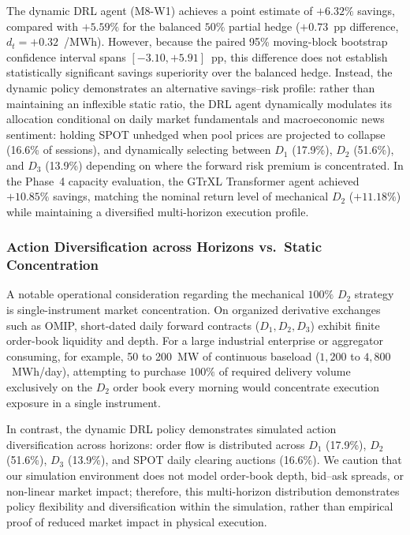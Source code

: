 The dynamic DRL agent (M8-W1) achieves a point estimate of $+6.32\%$ savings, compared with $+5.59\%$ for the balanced $50\%$ partial hedge ($+0.73$~pp difference, $d_t = +0.32$~\texteuro/MWh). However, because the paired 95\% moving-block bootstrap confidence interval spans $[-3.10, +5.91]$~pp, this difference does not establish statistically significant savings superiority over the balanced hedge. Instead, the dynamic policy demonstrates an alternative savings--risk profile: rather than maintaining an inflexible static ratio, the DRL agent dynamically modulates its allocation conditional on daily market fundamentals and macroeconomic news sentiment: holding SPOT unhedged when pool prices are projected to collapse (16.6\% of sessions), and dynamically selecting between $D_1$ (17.9\%), $D_2$ (51.6\%), and $D_3$ (13.9\%) depending on where the forward risk premium is concentrated. In the Phase~4 capacity evaluation, the GTrXL Transformer agent achieved $+10.85\%$ savings, matching the nominal return level of mechanical $D_2$ ($+11.18\%$) while maintaining a diversified multi-horizon execution profile.

\subsubsection{Action Diversification across Horizons vs.\ Static Concentration}

A notable operational consideration regarding the mechanical $100\%$ $D_2$ strategy is single-instrument market concentration. On organized derivative exchanges such as OMIP, short-dated daily forward contracts ($D_1, D_2, D_3$) exhibit finite order-book liquidity and depth. For a large industrial enterprise or aggregator consuming, for example, 50 to 200~MW of continuous baseload ($1{,}200$ to $4{,}800$~MWh/day), attempting to purchase $100\%$ of required delivery volume exclusively on the $D_2$ order book every morning would concentrate execution exposure in a single instrument.

In contrast, the dynamic DRL policy demonstrates simulated action diversification across horizons: order flow is distributed across $D_1$ (17.9\%), $D_2$ (51.6\%), $D_3$ (13.9\%), and SPOT daily clearing auctions (16.6\%). We caution that our simulation environment does not model order-book depth, bid--ask spreads, or non-linear market impact; therefore, this multi-horizon distribution demonstrates policy flexibility and diversification within the simulation, rather than empirical proof of reduced market impact in physical execution.

